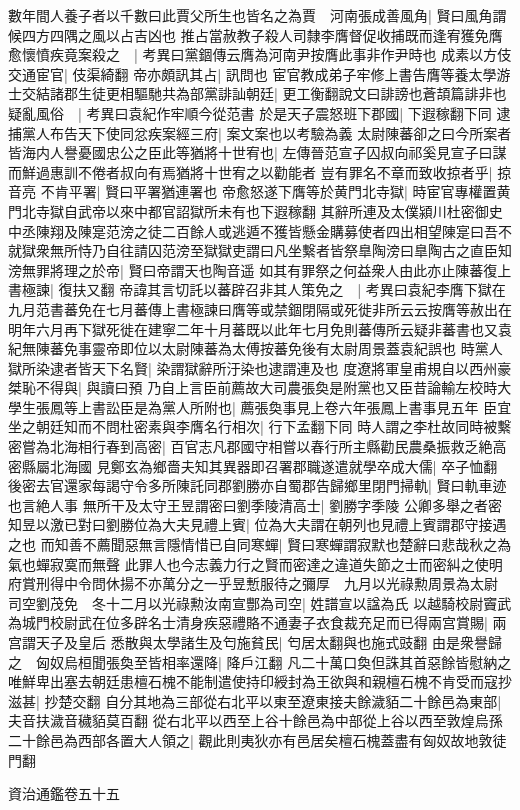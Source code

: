 數年間人養子者以千數曰此賈父所生也皆名之為賈　河南張成善風角|{
	賢曰風角謂候四方四隅之風以占吉凶也}
推占當赦教子殺人司隸李膺督促收捕既而逢宥獲免膺愈懷憤疾竟案殺之　|{
	考異曰黨錮傳云膺為河南尹按膺此事非作尹時也}
成素以方伎交通宦官|{
	伎渠綺翻}
帝亦頗訊其占|{
	訊問也}
宦官教成弟子牢修上書告膺等養太學游士交結諸郡生徒更相驅馳共為部黨誹訕朝廷|{
	更工衡翻說文曰誹謗也蒼頡篇誹非也}
疑亂風俗　|{
	考異曰袁紀作牢順今從范書}
於是天子震怒班下郡國|{
	下遐稼翻下同}
逮捕黨人布告天下使同忿疾案經三府|{
	案文案也以考驗為義}
太尉陳蕃卻之曰今所案者皆海内人譽憂國忠公之臣此等猶將十世宥也|{
	左傳晉范宣子囚叔向祁奚見宣子曰謀而鮮過惠訓不倦者叔向有焉猶將十世宥之以勸能者}
豈有罪名不章而致收掠者乎|{
	掠音亮}
不肯平署|{
	賢曰平署猶連署也}
帝愈怒遂下膺等於黄門北寺獄|{
	時宦官專權置黄門北寺獄自武帝以來中都官詔獄所未有也下遐稼翻}
其辭所連及太僕潁川杜密御史中丞陳翔及陳寔范滂之徒二百餘人或逃遁不獲皆懸金購募使者四出相望陳寔曰吾不就獄衆無所恃乃自往請囚范滂至獄獄吏謂曰凡坐繫者皆祭臯陶滂曰臯陶古之直臣知滂無罪將理之於帝|{
	賢曰帝謂天也陶音遥}
如其有罪祭之何益衆人由此亦止陳蕃復上書極諫|{
	復扶又翻}
帝諱其言切託以蕃辟召非其人策免之　|{
	考異曰袁紀李膺下獄在九月范書蕃免在七月蕃傳上書極諫曰膺等或禁錮閉隔或死徙非所云云按膺等赦出在明年六月再下獄死徙在建寧二年十月蕃既以此年七月免則蕃傳所云疑非蕃書也又袁紀無陳蕃免事靈帝即位以太尉陳蕃為太傅按蕃免後有太尉周景蓋袁紀誤也}
時黨人獄所染逮者皆天下名賢|{
	染謂獄辭所汙染也逮謂連及也}
度遼將軍皇甫規自以西州豪桀恥不得與|{
	與讀曰預}
乃自上言臣前薦故大司農張奐是附黨也又臣昔論輸左校時大學生張鳳等上書訟臣是為黨人所附也|{
	薦張奐事見上卷六年張鳳上書事見五年}
臣宜坐之朝廷知而不問杜密素與李膺名行相次|{
	行下孟翻下同}
時人謂之李杜故同時被繫密嘗為北海相行春到高密|{
	百官志凡郡國守相嘗以春行所主縣勸民農桑振救乏絶高密縣屬北海國}
見鄭玄為鄉嗇夫知其異器即召署郡職遂遣就學卒成大儒|{
	卒子恤翻}
後密去官還家每謁守令多所陳託同郡劉勝亦自蜀郡告歸鄉里閉門掃軌|{
	賢曰軌車迹也言絶人事}
無所干及太守王昱謂密曰劉季陵清高士|{
	劉勝字季陵}
公卿多舉之者密知昱以激已對曰劉勝位為大夫見禮上賓|{
	位為大夫謂在朝列也見禮上賓謂郡守接遇之也}
而知善不薦聞惡無言隱情惜已自同寒蟬|{
	賢曰寒蟬謂寂默也楚辭曰悲哉秋之為氣也蟬寂寞而無聲}
此罪人也今志義力行之賢而密達之違道失節之士而密糾之使明府賞刑得中令問休揚不亦萬分之一乎昱慙服待之彌厚　九月以光祿勲周景為太尉　司空劉茂免　冬十二月以光祿勲汝南宣酆為司空|{
	姓譜宣以諡為氏}
以越騎校尉竇武為城門校尉武在位多辟名士清身疾惡禮賂不通妻子衣食裁充足而已得兩宫賞賜|{
	兩宫謂天子及皇后}
悉散與太學諸生及匄施貧民|{
	匄居太翻與也施式豉翻}
由是衆譽歸之　匈奴烏桓聞張奐至皆相率還降|{
	降戶江翻}
凡二十萬口奐但誅其首惡餘皆慰納之唯鮮卑出塞去朝廷患檀石槐不能制遣使持印綬封為王欲與和親檀石槐不肯受而寇抄滋甚|{
	抄楚交翻}
自分其地為三部從右北平以東至遼東接夫餘濊貊二十餘邑為東部|{
	夫音扶濊音穢貊莫百翻}
從右北平以西至上谷十餘邑為中部從上谷以西至敦煌烏孫二十餘邑為西部各置大人領之|{
	觀此則夷狄亦有邑居矣檀石槐蓋盡有匈奴故地敦徒門翻}


資治通鑑卷五十五
